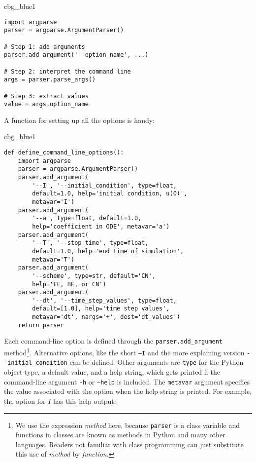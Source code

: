 \documentclass[graybox,sectrefs,envcountresetchap,open=right,final]{svmonodo}
\newenvironment{_cod_tight}[1]{
   \def\FrameCommand{\colorbox{#1}}
   \FrameRule0.6pt\MakeFramed {\FrameRestore}\vskip3mm}
   {\vskip0mm\endMakeFramed}
\newenvironment{cod}[1]{
\bgroup\rmfamily
\fboxsep=0mm\relax
\begin{_cod_tight}{#1}
\list{}{\parsep=-2mm\parskip=0mm\topsep=0pt\leftmargin=2mm
\rightmargin=2\leftmargin\leftmargin=4pt\relax}
\item\relax}
{\endlist\end{_cod_tight}\egroup}
\begin{document}
\begin{cod}{cbg_blue1}\begin{Verbatim}[numbers=none,fontsize=\fontsize{9pt}{9pt},baselinestretch=0.95,xleftmargin=2mm]
import argparse
parser = argparse.ArgumentParser()

# Step 1: add arguments
parser.add_argument('--option_name', ...)

# Step 2: interpret the command line
args = parser.parse_args()

# Step 3: extract values
value = args.option_name
\end{Verbatim}
\end{cod}
\noindent

A function for setting up all the options is handy:

\begin{cod}{cbg_blue1}\begin{Verbatim}[numbers=none,fontsize=\fontsize{9pt}{9pt},baselinestretch=0.95,xleftmargin=2mm]
def define_command_line_options():
    import argparse
    parser = argparse.ArgumentParser()
    parser.add_argument(
        '--I', '--initial_condition', type=float,
        default=1.0, help='initial condition, u(0)',
        metavar='I')
    parser.add_argument(
        '--a', type=float, default=1.0,
        help='coefficient in ODE', metavar='a')
    parser.add_argument(
        '--T', '--stop_time', type=float,
        default=1.0, help='end time of simulation',
        metavar='T')
    parser.add_argument(
        '--scheme', type=str, default='CN',
        help='FE, BE, or CN')
    parser.add_argument(
        '--dt', '--time_step_values', type=float,
        default=[1.0], help='time step values',
        metavar='dt', nargs='+', dest='dt_values')
    return parser
\end{Verbatim}
\end{cod}
\noindent

Each command-line option is defined through the \Verb!parser.add_argument!
method\footnote{We use the expression \emph{method} here, because \texttt{parser} is a class variable and functions in classes are known as methods in Python and many other languages. Readers not familiar with class programming can just substitute this use of \emph{method} by \emph{function}.}. Alternative options, like the short \texttt{--I} and the more
explaining version \Verb!--initial_condition! can be defined. Other arguments
are \texttt{type} for the Python object type, a default value, and a help
string, which gets printed if the command-line argument \texttt{-h} or \texttt{--help} is
included. The \texttt{metavar} argument specifies the value associated with
the option when the help string is printed. For example, the option for
$I$ has this help output:
\end{document}
